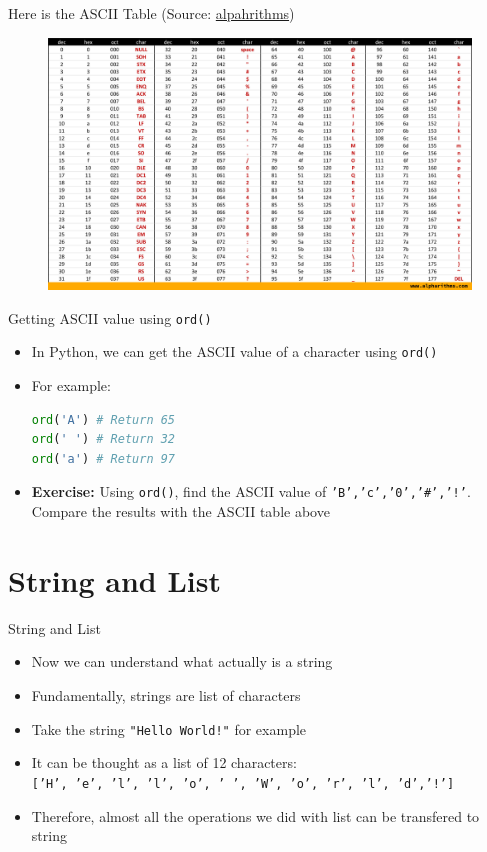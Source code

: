 \documentclass[10pt,xcolor={table,dvipsnames},t]{beamer}
\begin{document}
\begin{frame}[fragile]
  Here is the ASCII Table (Source: \href{https://www.alpharithms.com/ascii-table-512119/}{alpahrithms})
  \begin{figure}
    \includegraphics[width=\textwidth]{img/ascii-table.jpg}
  \end{figure}
\end{frame}

\begin{frame}[fragile]{Getting ASCII value using \texttt{ord()}}
  \begin{itemize}
    \item In Python, we can get the ASCII value of a character using \texttt{ord()}
    \item For example: 
\begin{lstlisting}[language=python]
ord('A') # Return 65
ord(' ') # Return 32
ord('a') # Return 97
\end{lstlisting}
    \item \textbf{Exercise:} Using \texttt{ord()}, find the ASCII value of \texttt{'B','c','0','\#','!'}. Compare the results with the ASCII table above
  \end{itemize}
\end{frame}

\section{String and List}
\begin{frame}[fragile]{String and List}
  \begin{itemize}
    \item Now we can understand what actually is a string
    \item Fundamentally, strings are list of characters
    \item Take the string \texttt{"Hello World!"} for example
    \item It can be thought as a list of 12 characters:\\\texttt{['H', 'e', 'l', 'l', 'o', ' ', 'W', 'o', 'r', 'l', 'd','!']}
    \item Therefore, almost all the operations we did with list can be transfered to string
  \end{itemize}
\end{frame}
\end{document}
